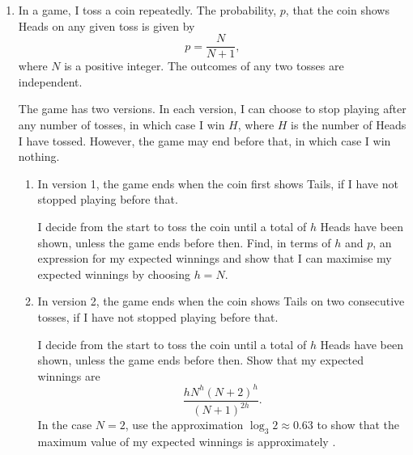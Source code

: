 \documentclass[12pt]{article}
\newcommand{\pounds}{\textsterling}
\begin{document}
\begin{enumerate}
You may assume that the sum of the moments of the forces acting on the motorbike about the centre of mass is zero. By taking moments about the centre of mass show that, as the acceleration of the motorbike increases from zero, the rear wheel will slip before the front wheel loses contact with the road if
\[
\mu<\frac{b-d}{h}. \tag{*}
\]
If the inequality $(*)$ holds and the rear wheel does not slip, show that the maximum acceleration is
\[
\frac{\mu d g}{b-\mu h}.
\]
If the inequality $(*)$ does not hold, find the maximum acceleration given that the front wheel remains in contact with the road.

\section*{Section C: Probability and Statistics}

\item In a game, I toss a coin repeatedly. The probability, $p$, that the coin shows Heads on any given toss is given by
\[
p=\frac{N}{N+1},
\]
where $N$ is a positive integer. The outcomes of any two tosses are independent.

The game has two versions. In each version, I can choose to stop playing after any number of tosses, in which case I win \pounds$H$, where $H$ is the number of Heads I have tossed. However, the game may end before that, in which case I win nothing.
\begin{enumerate}
\item In version 1, the game ends when the coin first shows Tails, if I have not stopped playing before that.

I decide from the start to toss the coin until a total of $h$ Heads have been shown, unless the game ends before then. Find, in terms of $h$ and $p$, an expression for my expected winnings and show that I can maximise my expected winnings by choosing $h=N$.
\item In version 2, the game ends when the coin shows Tails on two consecutive tosses, if I have not stopped playing before that.

I decide from the start to toss the coin until a total of $h$ Heads have been shown, unless the game ends before then. Show that my expected winnings are
\[
\frac{hN^h(N+2)^h}{(N+1)^{2h}}.
\]
In the case $N=2$, use the approximation $\log_3 2\approx 0.63$ to show that the maximum value of my expected winnings is approximately \pounds 3.
\end{enumerate}


\end{enumerate}
\end{document}
